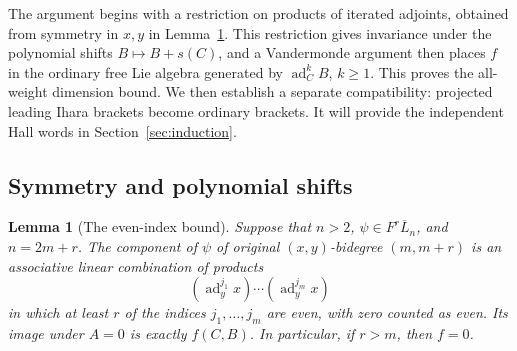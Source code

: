 \documentclass[11pt]{article}
\newtheorem{lemma}[theorem]{Lemma}
\theoremstyle{definition}
\theoremstyle{remark}
\numberwithin{equation}{section}
\begin{document}
The argument begins with a restriction on products of iterated adjoints,
obtained from symmetry in $x,y$ in Lemma~\ref{lem:even-indices}.
This restriction gives invariance under the polynomial shifts
$B\mapsto B+s(C)$, and a Vandermonde argument then places $f$ in the
ordinary free Lie algebra generated by $\operatorname{ad}_C^kB$, $k\geq1$.
This proves the all-weight dimension bound.  We then establish a
separate compatibility: projected leading Ihara brackets become
ordinary brackets.  It will provide the independent Hall words in
Section~\ref{sec:induction}.

\subsection{Symmetry and polynomial shifts}

\begin{lemma}[The even-index bound]
\label{lem:even-indices}
Suppose that $n>2$, $\psi\in F^r\overline L_n$, and $n=2m+r$.
The component of $\psi$ of original $(x,y)$-bidegree $(m,m+r)$
is an associative linear combination of products
\begin{equation}
 \label{eq:swapped-products}
 (\operatorname{ad}_y^{j_1}x)\cdots(\operatorname{ad}_y^{j_m}x)
\end{equation}
in which at least $r$ of the indices $j_1,\ldots,j_m$ are even,
with zero counted as even.
Its image under $A=0$ is exactly $f(C,B)$.
In particular, if $r>m$, then $f=0$.
\end{lemma}
\end{document}

